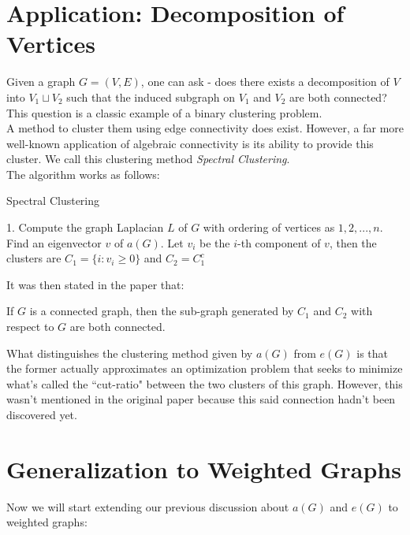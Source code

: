 \documentclass{article}
\begin{document}
\section{Application: Decomposition of Vertices}

Given a graph $G = (V, E)$, one can ask - does there exists a decomposition of $V$ into $V_1 \sqcup V_2$ such that the induced subgraph on $V_1$ and $V_2$ are both connected? This question is a classic example of a binary clustering problem.\\

A method to cluster them using edge connectivity does exist. However, a far more well-known application of algebraic connectivity is its ability to provide this cluster. We call this clustering method \textit{Spectral Clustering}.\\

The algorithm works as follows:

\begin{algorithm}
\caption{Spectral Clustering}\label{alg:two}
1. Compute the graph Laplacian $L$ of $G$ with ordering of vertices as $1, 2, ..., n$. Find an eigenvector $v$ of $a(G)$. Let $v_i$ be the $i$-th component of $v$, then the clusters are $C_1 = \{i: v_i \geq 0\}$ and $C_2 = C_1^c$
\end{algorithm}

It was then stated in the paper that:

\begin{theorem}
    If $G$ is a connected graph, then the sub-graph generated by $C_1$ and $C_2$ with respect to $G$ are both connected.
\end{theorem}

What distinguishes the clustering method given by $a(G)$ from $e(G)$ is that the former actually approximates an optimization problem that seeks to minimize what's called the ``cut-ratio" between the two clusters of this graph. However, this wasn't mentioned in the original paper because this said connection hadn't been discovered yet.

\section{Generalization to Weighted Graphs}

Now we will start extending our previous discussion about $a(G)$ and $e(G)$ to weighted graphs:
\end{document}
